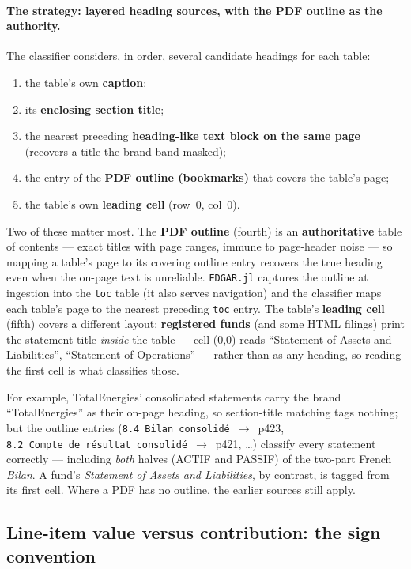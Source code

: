 \documentclass[11pt,a4paper]{report}
\begin{document}
\paragraph{The strategy: layered heading sources, with the PDF outline as the authority.} The classifier
considers, in order, several candidate headings for each table:
\begin{enumerate}
  \item the table's own \textbf{caption};
  \item its \textbf{enclosing section title};
  \item the nearest preceding \textbf{heading-like text block on the same page} (recovers a title the
    brand band masked);
  \item the entry of the \textbf{PDF outline (bookmarks)} that covers the table's page;
  \item the table's own \textbf{leading cell} (row~0, col~0).
\end{enumerate}
Two of these matter most. The \textbf{PDF outline} (fourth) is an \textbf{authoritative} table of contents
--- exact titles with page ranges, immune to page-header noise --- so mapping a table's page to its
covering outline entry recovers the true heading even when the on-page text is unreliable.
\texttt{EDGAR.jl} captures the outline at ingestion into the \texttt{toc} table (it also serves navigation)
and the classifier maps each table's page to the nearest preceding \texttt{toc} entry. The table's
\textbf{leading cell} (fifth) covers a different layout: \textbf{registered funds} (and some HTML filings)
print the statement title \emph{inside} the table --- cell (0,0) reads ``Statement of Assets and
Liabilities'', ``Statement of Operations'' --- rather than as any heading, so reading the first cell is
what classifies those.

For example, TotalEnergies' consolidated statements carry the brand ``TotalEnergies'' as their on-page
heading, so section-title matching tags nothing; but the outline entries
(\texttt{8.4~Bilan~consolidé}~$\rightarrow$~p423, \texttt{8.2~Compte~de~résultat~consolidé}~$\rightarrow$~p421,
\dots) classify every statement correctly --- including \emph{both} halves (ACTIF and PASSIF) of the
two-part French \emph{Bilan}. A fund's \emph{Statement of Assets and Liabilities}, by contrast, is tagged
from its first cell. Where a PDF has no outline, the earlier sources still apply.

\subsection{Line-item value versus contribution: the sign convention}\label{sec:pdf-sign}
\end{document}
